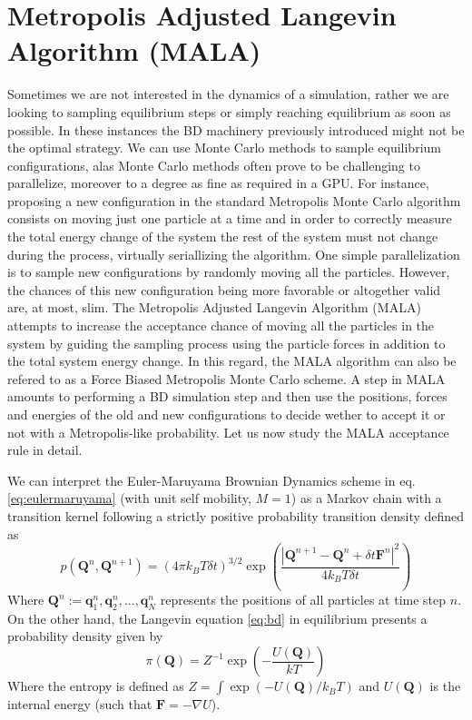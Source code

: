 \documentclass[ twoside,openright,titlepage,numbers=noenddot,%
headinclude,footinclude,cleardoublepage=empty,abstract=on,
BCOR=5mm,paper=a4,fontsize=11pt, dvipsnames
]{scrreprt}
\renewcommand{\vec}[1]{\bm{#1}}
\newcommand{\gpu}{\gls{GPU}\xspace}
\newcommand{\dt}{\delta t}
\newcommand{\kT}{k_B T}
\newcommand{\ppos}{q}
\begin{document}
\section{Metropolis Adjusted Langevin Algorithm (MALA)}
Sometimes we are not interested in the dynamics of a simulation, rather we are looking to sampling equilibrium steps or simply reaching equilibrium as soon as possible. In these instances the \gls{BD} machinery previously introduced might not be the optimal strategy. We can use Monte Carlo methods to sample equilibrium configurations, alas Monte Carlo methods often prove to be challenging to parallelize, moreover to a degree as fine as required in a \gpu. For instance, proposing a new configuration in the standard Metropolis Monte Carlo algorithm consists on moving just one particle at a time and in order to correctly measure the total energy change of the system the rest of the system must not change during the process, virtually seriallizing the algorithm. One simple parallelization is to sample new configurations by randomly moving all the particles. However, the chances of this new configuration being more favorable or altogether valid are, at most, slim.
The Metropolis Adjusted Langevin Algorithm (MALA) attempts to increase the acceptance chance of moving all the particles in the system by guiding the sampling process using the particle forces in addition to the total system energy change. In this regard, the MALA algorithm can also be refered to as a Force Biased Metropolis Monte Carlo scheme.
 A step in MALA amounts to performing a \gls{BD} simulation step and then use the positions, forces and energies of the old and new configurations to decide wether to accept it or not with a Metropolis-like probability. Let us now study the MALA acceptance rule in detail.

We can interpret the Euler-Maruyama Brownian Dynamics scheme in eq. \eqref{eq:eulermaruyama} (with unit self mobility, $M=1$) as a Markov chain with a transition kernel following a strictly positive probability transition density defined as
\begin{equation}
  \label{eq:malakernel}
  p( \vec{Q}^n, \vec{Q}^{n+1}) = (4\pi \kT\dt)^{3/2}\exp\left(\frac{\left|\vec{Q}^{n+1} - \vec{Q}^n + \dt\vec{F}^n\right|^2}{4\kT\dt}\right)
\end{equation}
Where $\vec{Q}^n:={\vec{\ppos}_1^n, \vec{\ppos}^n_2, ..., \vec{\ppos}^n_N}$ represents the positions of all particles at time step $n$.
On the other hand, the Langevin equation \eqref{eq:bd} in equilibrium presents a probability density given by
\begin{equation}
  \label{eq:malatarget}
  \pi(\vec{Q}) = Z^{-1}\exp\left(-\frac{U(\vec{Q})}{kT}\right)
\end{equation}
Where the entropy is defined as $Z = \int\exp\left(-U(\vec{Q})/\kT\right)$ and $U(\vec{Q})$ is the internal energy (such that $\vec{F} = -\nabla U$).
\end{document}
